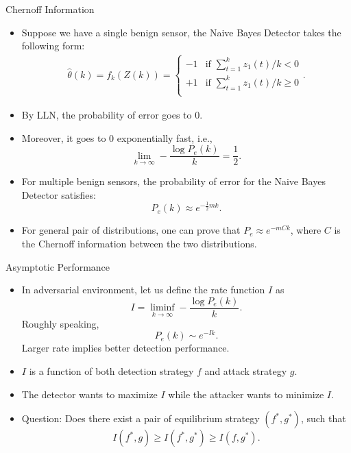 \documentclass[10pt]{beamer}
\begin{document}
\begin{frame}{Chernoff Information}
  \begin{itemize}
  \item Suppose we have a single benign sensor, the Naive Bayes Detector takes the following form:
    \begin{align*}
      \hat \theta(k)=f_k(Z(k))=\begin{cases}
        -1 &\text{if }\sum_{t=1}^k z_1(t)/k < 0\\
        +1 &\text{if }\sum_{t=1}^k z_1(t)/k \geq 0\\
      \end{cases}.
    \end{align*}
  \item By LLN, the probability of error goes to $0$.
  \item Moreover, it goes to $0$ exponentially fast, i.e.,
    \begin{displaymath}
      \lim_{k\rightarrow\infty}-\frac{\log P_e(k)}{k}= \frac{1}{2}.
    \end{displaymath}
  \item For multiple benign sensors, the probability of error for the Naive Bayes Detector satisfies:
    \begin{displaymath}
      P_e(k)\approx e^{-\frac{1}{2}mk}.
    \end{displaymath}
  \item For general pair of distributions, one can prove that $P_e \approx e^{-mCk}$, where $C$ is the Chernoff information between the two distributions.
  \end{itemize}
\end{frame}

\begin{frame}{Asymptotic Performance}
  \begin{itemize}
  \item In adversarial environment, let us define the rate function $I$ as
    \begin{displaymath}
      I = \liminf_{k\rightarrow\infty} -\frac{\log P_e(k)}{k}.
    \end{displaymath}
    Roughly speaking, 
    \begin{displaymath}
      P_e(k)\sim e^{-Ik}. 
    \end{displaymath}
    Larger rate implies better detection performance.
  \item  $I$ is a function of both detection strategy $f$ and attack strategy $g$.
  \item The detector wants to maximize $I$ while the attacker wants to minimize $I$.
  \item Question: Does there exist a pair of equilibrium strategy $(f^*,g^*)$, such that
    \begin{displaymath}
      I(f^*,g)\geq I(f^*,g^*) \geq I(f,g^*).	
    \end{displaymath}
  \end{itemize}
\end{frame}
\end{document}
